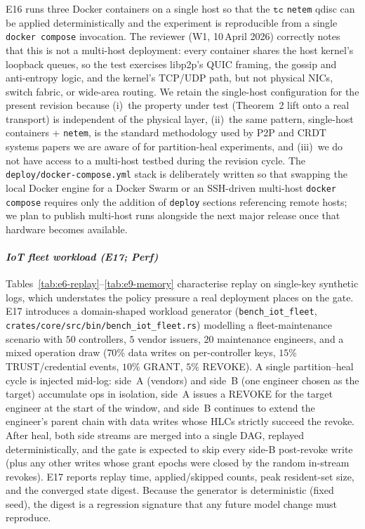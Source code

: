 \documentclass[10pt,journal,compsoc]{IEEEtran}
\begin{document}
E16 runs three Docker containers on a single host so that the $\mathtt{tc}$ \texttt{netem} qdisc can be applied deterministically and the experiment is reproducible from a single \texttt{docker compose} invocation. The reviewer (W1, 10\,April 2026) correctly notes that this is not a multi-host deployment: every container shares the host kernel's loopback queues, so the test exercises libp2p's QUIC framing, the gossip and anti-entropy logic, and the kernel's TCP/UDP path, but not physical NICs, switch fabric, or wide-area routing. We retain the single-host configuration for the present revision because (i)~the property under test (Theorem~2 lift onto a real transport) is independent of the physical layer, (ii)~the same pattern, single-host containers + \texttt{netem}, is the standard methodology used by P2P and CRDT systems papers we are aware of for partition-heal experiments, and (iii)~we do not have access to a multi-host testbed during the revision cycle. The \texttt{deploy/docker-compose.yml} stack is deliberately written so that swapping the local Docker engine for a Docker Swarm or an SSH-driven multi-host \texttt{docker compose} requires only the addition of \texttt{deploy} sections referencing remote hosts; we plan to publish multi-host runs alongside the next major release once that hardware becomes available.

\paragraph*{\textbf{\textit{IoT fleet workload (E17; Perf)}}}
Tables~\ref{tab:e6-replay}--\ref{tab:e9-memory} characterise replay on single-key synthetic logs, which understates the policy pressure a real deployment places on the gate. E17 introduces a domain-shaped workload generator (\texttt{bench\_iot\_fleet}, \texttt{crates/core/src/bin/bench\_iot\_fleet.rs}) modelling a fleet-maintenance scenario with $50$ controllers, $5$ vendor issuers, $20$ maintenance engineers, and a mixed operation draw ($70$\% data writes on per-controller keys, $15$\% TRUST/credential events, $10$\% GRANT, $5$\% REVOKE). A single partition--heal cycle is injected mid-log: side~A (vendors) and side~B (one engineer chosen as the target) accumulate ops in isolation, side~A issues a \textsc{REVOKE} for the target engineer at the start of the window, and side~B continues to extend the engineer's parent chain with data writes whose HLCs strictly succeed the revoke. After heal, both side streams are merged into a single DAG, replayed deterministically, and the gate is expected to skip every side-B post-revoke write (plus any other writes whose grant epochs were closed by the random in-stream revokes). E17 reports replay time, applied/skipped counts, peak resident-set size, and the converged state digest. Because the generator is deterministic (fixed seed), the digest is a regression signature that any future model change must reproduce.
\end{document}
